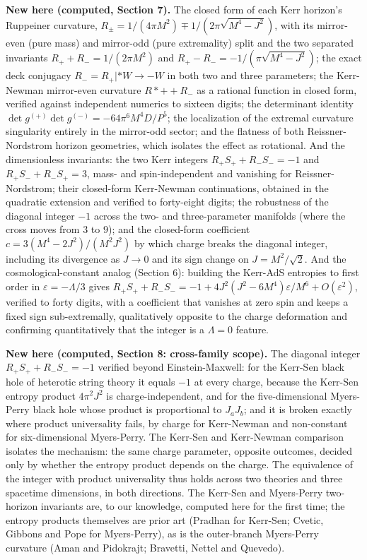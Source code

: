 \documentclass[11pt]{article}
\begin{document}
\textbf{New here (computed, Section 7).} The closed form of each Kerr horizon's Ruppeiner curvature, $R_\pm = 1/(4\pi M^2) \mp 1/(2\pi\sqrt{M^4-J^2})$, with its mirror-even (pure mass) and mirror-odd (pure extremality) split and the two separated invariants $R_+ + R_- = 1/(2\pi M^2)$ and $R_+ - R_- = -1/(\pi\sqrt{M^4-J^2})$; the exact deck conjugacy $R_- = R_+|*{W\to -W}$ in both two and three parameters; the Kerr-Newman mirror-even curvature $R*+ + R_-$ as a rational function in closed form, verified against independent numerics to sixteen digits; the determinant identity $\det g^{(+)}\det g^{(-)} = -64\pi^6 M^4 D/P^5$; the localization of the extremal curvature singularity entirely in the mirror-odd sector; and the flatness of both Reissner-Nordstrom horizon geometries, which isolates the effect as rotational. And the dimensionless invariants: the two Kerr integers $R_+S_+ + R_-S_- = -1$ and $R_+S_- + R_-S_+ = 3$, mass- and spin-independent and vanishing for Reissner-Nordstrom; their closed-form Kerr-Newman continuations, obtained in the quadratic extension and verified to forty-eight digits; the robustness of the diagonal integer $-1$ across the two- and three-parameter manifolds (where the cross moves from $3$ to $9$); and the closed-form coefficient $c = 3(M^4-2J^2)/(M^2J^2)$ by which charge breaks the diagonal integer, including its divergence as $J\to 0$ and its sign change on $J = M^2/\sqrt{2}$. And the cosmological-constant analog (Section 6): building the Kerr-AdS entropies to first order in $\varepsilon = -\Lambda/3$ gives $R_+S_+ + R_-S_- = -1 + 4J^2(J^2-6M^4)\varepsilon/M^6 + O(\varepsilon^2)$, verified to forty digits, with a coefficient that vanishes at zero spin and keeps a fixed sign sub-extremally, qualitatively opposite to the charge deformation and confirming quantitatively that the integer is a $\Lambda = 0$ feature.

\textbf{New here (computed, Section 8: cross-family scope).} The diagonal integer $R_+S_+ + R_-S_- = -1$ verified beyond Einstein-Maxwell: for the Kerr-Sen black hole of heterotic string theory it equals $-1$ at every charge, because the Kerr-Sen entropy product $4\pi^2 J^2$ is charge-independent, and for the five-dimensional Myers-Perry black hole whose product is proportional to $J_aJ_b$; and it is broken exactly where product universality fails, by charge for Kerr-Newman and non-constant for six-dimensional Myers-Perry. The Kerr-Sen and Kerr-Newman comparison isolates the mechanism: the same charge parameter, opposite outcomes, decided only by whether the entropy product depends on the charge. The equivalence of the integer with product universality thus holds across two theories and three spacetime dimensions, in both directions. The Kerr-Sen and Myers-Perry two-horizon invariants are, to our knowledge, computed here for the first time; the entropy products themselves are prior art (Pradhan for Kerr-Sen; Cvetic, Gibbons and Pope for Myers-Perry), as is the outer-branch Myers-Perry curvature (Aman and Pidokrajt; Bravetti, Nettel and Quevedo).
\end{document}
